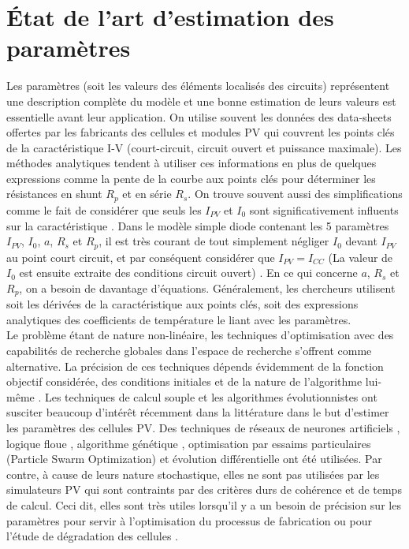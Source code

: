 \section{État de l'art d'estimation des paramètres}

Les paramètres (soit les valeurs des éléments localisés des circuits) représentent une description complète du modèle et une bonne estimation de leurs valeurs est essentielle avant leur application. On utilise souvent les données des data-sheets offertes par les fabricants des cellules et modules PV qui couvrent les points clés de la caractéristique I-V (court-circuit, circuit ouvert et puissance maximale). Les méthodes analytiques tendent à utiliser ces informations en plus de quelques expressions comme la pente de la courbe aux points clés pour déterminer les résistances en shunt $R_p$ et en série $R_s$. On trouve souvent aussi des simplifications comme le fait de considérer que seuls les $I_{PV}$ et $I_0$ sont significativement influents sur la caractéristique \cite{Ciulla2014}.
Dans le modèle simple diode contenant les 5 paramètres $I_{PV}$, $I_0$, $a$, $R_s$ et $R_p$, il est très courant de tout simplement négliger $I_0$ devant $I_{PV}$ au point court circuit, et par conséquent considérer que $I_{PV} = I_{CC}$ (La valeur de $I_0$ est ensuite extraite des conditions circuit ouvert) \cite{Villalva2009,Ciulla2014,Tsai2008}. En ce qui concerne $a$, $R_s$ et $R_p$, on a besoin de davantage d'équations. Généralement, les chercheurs utilisent soit les dérivées de la caractéristique aux points clés, soit des expressions analytiques des coefficients de température le liant avec les paramètres.\\
Le problème étant de nature non-linéaire, les techniques d'optimisation avec des capabilités de recherche globales dans l'espace de recherche s'offrent comme alternative. La précision de ces techniques dépends évidemment de la fonction objectif considérée, des conditions initiales et de la nature de l'algorithme lui-même \cite{Easwarakhanthan1986, El-Naggar2012, DaCosta2010}. Les techniques de calcul souple et les algorithmes évolutionnistes ont susciter beaucoup d'intérêt récemment dans la littérature dans le but d'estimer les paramètres des cellules PV. Des techniques de réseaux de neurones artificiels \cite{Balzani2005, Zhang2005a, Karatepe2006}, logique floue \cite{Elhagry1997, Bendib2013, AbdulHadi2004}, algorithme génétique \cite{Jervase2001, Moldovan2009, Ismail2013}, optimisation par essaims particulaires (Particle Swarm Optimization) \cite{Ye2009, Soon2012} et évolution différentielle \cite{DaCosta2010, Ishaque2012, Gong2013} ont été utilisées. Par contre, à cause de leurs nature stochastique, elles ne sont pas utilisées par les simulateurs PV qui sont contraints par des critères durs de cohérence et de temps de calcul. Ceci dit, elles sont très utiles lorsqu'il y a un besoin de précision sur les paramètres pour servir à l'optimisation du processus de fabrication ou pour l'étude de dégradation des cellules \cite{Ikegami2001,Balzani2005}.

